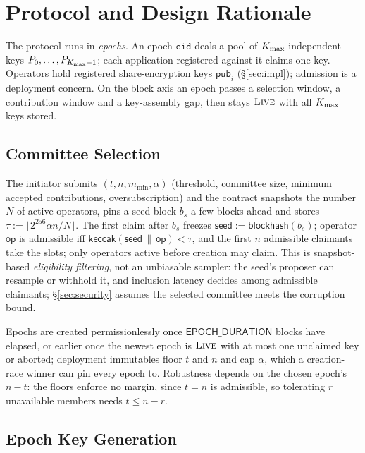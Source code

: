 \section{Protocol and Design Rationale}
\label{sec:protocol}

The protocol runs in \emph{epochs}. An epoch $\mathtt{eid}$ deals a pool of $K_{\max}$ independent keys $P_0, \dots, P_{K_{\max}-1}$; each application registered against it claims one key. Operators hold registered share-encryption keys $\mathsf{pub}_i$ (\S\ref{sec:impl}); admission is a deployment concern. On the block axis an epoch passes a selection window, a contribution window and a key-assembly gap, then stays $\textsc{Live}$ with all $K_{\max}$ keys stored.

\subsection{Committee Selection}
\label{subsec:lottery}

The initiator submits $(t, n, m_{\min}, \alpha)$ (threshold, committee size, minimum accepted contributions, oversubscription) and the contract snapshots the number $N$ of active operators, pins a seed block $b_s$ a few blocks ahead and stores $\tau := \lfloor 2^{256} \alpha n / N \rfloor$. The first claim after $b_s$ freezes $\mathsf{seed} := \mathsf{blockhash}(b_s)$; operator $\mathsf{op}$ is admissible iff $\mathsf{keccak}(\mathsf{seed} \,\|\, \mathsf{op}) < \tau$, and the first $n$ admissible claimants take the slots; only operators active before creation may claim. This is snapshot-based \emph{eligibility filtering}, not an unbiasable sampler: the seed's proposer can resample or withhold it, and inclusion latency decides among admissible claimants; \S\ref{sec:security} assumes the selected committee meets the corruption bound.

Epochs are created permissionlessly once $\mathsf{EPOCH\_DURATION}$ blocks have elapsed, or earlier once the newest epoch is $\textsc{Live}$ with at most one unclaimed key or aborted; deployment immutables floor $t$ and $n$ and cap $\alpha$, which a creation-race winner can pin every epoch to. Robustness depends on the chosen epoch's $n - t$: the floors enforce no margin, since $t = n$ is admissible, so tolerating $r$ unavailable members needs $t \le n - r$.

\subsection{Epoch Key Generation}
\label{subsec:epoch}


